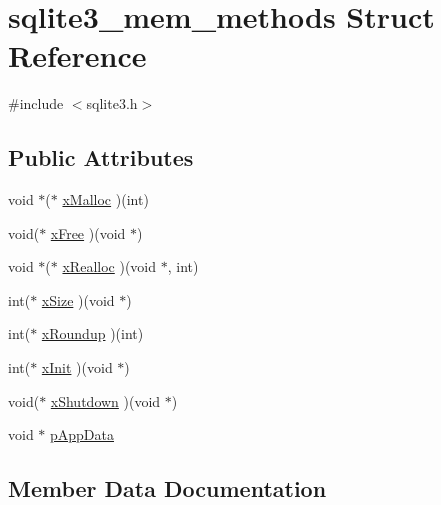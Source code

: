 \hypertarget{structsqlite3__mem__methods}{}\section{sqlite3\+\_\+mem\+\_\+methods Struct Reference}
\label{structsqlite3__mem__methods}


{\ttfamily \#include $<$sqlite3.\+h$>$}

\subsection*{Public Attributes}
\begin{DoxyCompactItemize}
\item 
void $\ast$($\ast$ \mbox{\hyperlink{structsqlite3__mem__methods_a19aee06ad5c1c7041f55725b6adb2b18}{x\+Malloc}} )(int)
\item 
void($\ast$ \mbox{\hyperlink{structsqlite3__mem__methods_a17d4fe3177f86bd7b559ecadaa343ee8}{x\+Free}} )(void $\ast$)
\item 
void $\ast$($\ast$ \mbox{\hyperlink{structsqlite3__mem__methods_a82ef8b50d6b9920c1dadb3257cf36a3a}{x\+Realloc}} )(void $\ast$, int)
\item 
int($\ast$ \mbox{\hyperlink{structsqlite3__mem__methods_a703ec736e9ce21fd43b9602bcd07fa8e}{x\+Size}} )(void $\ast$)
\item 
int($\ast$ \mbox{\hyperlink{structsqlite3__mem__methods_aaf22c6bca12dc6a3f5851e2b6b59835d}{x\+Roundup}} )(int)
\item 
int($\ast$ \mbox{\hyperlink{structsqlite3__mem__methods_a870eddbe27d9062ed2fb49ba13233501}{x\+Init}} )(void $\ast$)
\item 
void($\ast$ \mbox{\hyperlink{structsqlite3__mem__methods_ae3b1f92553e714484515409eefec5c2f}{x\+Shutdown}} )(void $\ast$)
\item 
void $\ast$ \mbox{\hyperlink{structsqlite3__mem__methods_a390f66d08d5a480544e919f64d7713de}{p\+App\+Data}}
\end{DoxyCompactItemize}


\subsection{Member Data Documentation}
\mbox{\label{structsqlite3__mem__methods_a390f66d08d5a480544e919f64d7713de}} 
